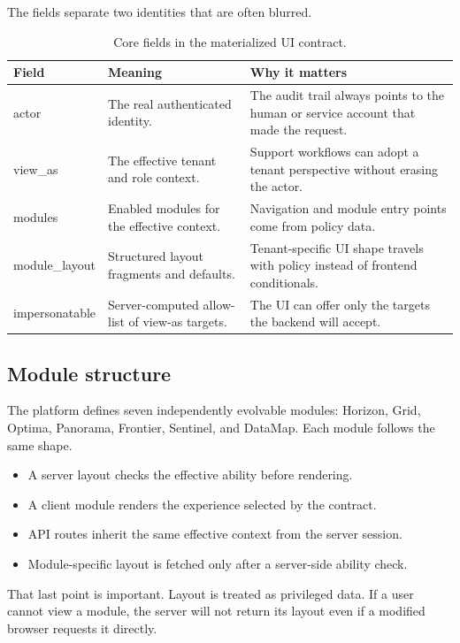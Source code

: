 The fields separate two identities that are often blurred.

\begin{table}[H]
  \centering
  \small
  \begin{tabularx}{\textwidth}{>{\ttfamily\raggedright\arraybackslash}p{3cm} X X}
    \toprule
    \textnormal{\textbf{Field}} & \textbf{Meaning} & \textbf{Why it matters} \\
    \midrule
    actor & The real authenticated identity. & The audit trail always points to the human or service account that made the request. \\
    view\_as & The effective tenant and role context. & Support workflows can adopt a tenant perspective without erasing the actor. \\
    modules & Enabled modules for the effective context. & Navigation and module entry points come from policy data. \\
    module\_layout & Structured layout fragments and defaults. & Tenant-specific UI shape travels with policy instead of frontend conditionals. \\
    impersonatable & Server-computed allow-list of view-as targets. & The UI can offer only the targets the backend will accept. \\
    \bottomrule
  \end{tabularx}
  \caption{Core fields in the materialized UI contract.}
  \label{tab:contract_fields}
\end{table}

\subsection{Module structure}
\label{sec:modules}

The platform defines seven independently evolvable modules: Horizon, Grid, Optima, Panorama, Frontier, Sentinel, and DataMap. Each module follows the same shape.

\begin{itemize}
  \item A server layout checks the effective ability before rendering.
  \item A client module renders the experience selected by the contract.
  \item API routes inherit the same effective context from the server session.
  \item Module-specific layout is fetched only after a server-side ability check.
\end{itemize}

That last point is important. Layout is treated as privileged data. If a user cannot view a module, the server will not return its layout even if a modified browser requests it directly.
